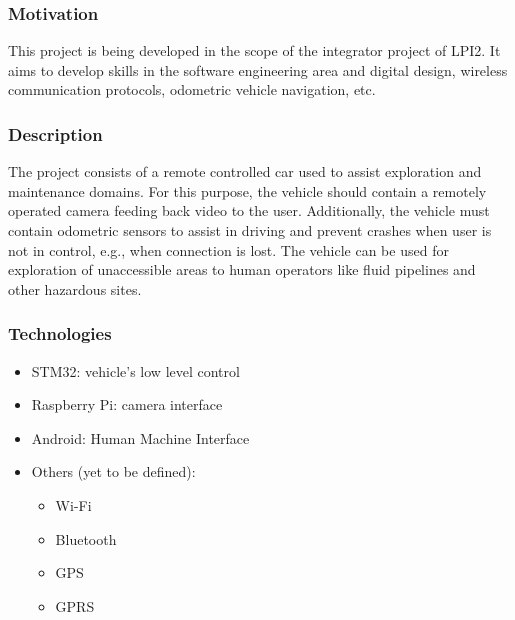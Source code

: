 \documentclass[11pt]{article}
\begin{document}
\subsubsection{Motivation}
\label{sec:org5cf0d10}
This project is being developed in the scope of the integrator project of
LPI2. It aims to develop skills in the software engineering area and digital
design, wireless communication protocols, odometric vehicle navigation, etc. 

\subsubsection{Description}
\label{sec:orgeca8efe}
  The project consists of a remote controlled car used to assist exploration
  and maintenance domains. For this purpose, the vehicle should contain a
  remotely operated camera feeding back video to the user. Additionally, the
  vehicle must contain odometric sensors to assist in driving and prevent
  crashes when user is not in control, e.g., when connection is lost.
The vehicle can be used for exploration of unaccessible areas to human operators
  like fluid pipelines and other hazardous sites.
\subsubsection{Technologies}
\label{sec:org5114a76}
\begin{itemize}
\item STM32: vehicle's low level control
\item Raspberry Pi: camera interface
\item Android: Human Machine Interface
\item Others (yet to be defined):
\begin{itemize}
\item Wi-Fi
\item Bluetooth
\item GPS
\item GPRS
\end{itemize}
\end{itemize}
\end{document}
